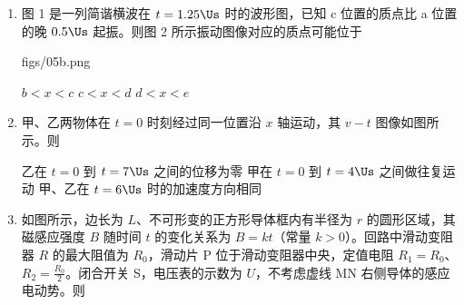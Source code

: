 \documentclass[\gkver]{gaokaozhenti}
\begin{document}
\begin{enumerate}
{如果人到了该行星，其体重是地球上的 $2\frac{2}{3}$ 倍}
{该行星与“Glicsc581”的距离是日地距离的 $\sqrt{\frac{365}{13}}$ 倍}
{由于该行星公转速率比地球大，地球上的米尺如果被带上该行星，其长度一定会变短}


\item
图 1 是一列简谐横波在 $t=1.25\Us$ 时的波形图，已知 c 位置的质点比 a 位置的晚 $0.5\Us$ 起振。则图 2 所示振动图像对应的质点可能位于

{figs/05b.png}

{$b<x<c$}
{$c<x<d$}
{$d<x<e$}


\item
甲、乙两物体在 $t=0$ 时刻经过同一位置沿 $x$ 轴运动，其 $v-t$ 图像如图所示。则


{乙在 $t=0$ 到 $t=7\Us$ 之间的位移为零}
{甲在 $t=0$ 到 $t=4\Us$ 之间做往复运动}
{甲、乙在 $t=6\Us$ 时的加速度方向相同}


\item
如图所示，边长为 $L$、不可形变的正方形导体框内有半径为 $r$ 的圆形区域，其磁感应强度 $B$ 随时间 $t$ 的变化关系为 $B=kt$（常量 $k>0$）。回路中滑动变阻器 $R$ 的最大阻值为 $R_{0}$，滑动片 P 位于滑动变阻器中央，定值电阻 $R_{1}=R_{0}$、$R_{2}=\frac{R_{0}}{2}$。闭合开关 S，电压表的示数为 $U$，不考虑虚线 MN 右侧导体的感应电动势。则


\end{enumerate}
\end{document}
